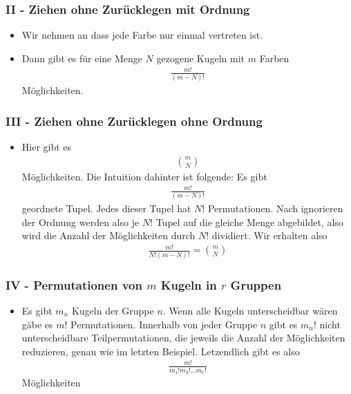 \documentclass{scrartcl}
\begin{document}
\subsubsection*{II - Ziehen ohne Zurücklegen mit Ordnung}
\begin{itemize}
    \item Wir nehmen an dass jede Farbe nur einmal vertreten ist.
    \item Dann gibt es für eine Menge $N$ gezogene Kugeln mit $m$ Farben
    \begin{align*}
        \frac{m!}{(m-N)!}
    \end{align*}
    Möglichkeiten.
\end{itemize}
\subsubsection*{III - Ziehen ohne Zurücklegen ohne Ordnung}
\begin{itemize}
    \item Hier gibt es
    \begin{align*}
        \binom{m}{N}
    \end{align*}
    Möglichkeiten. Die Intuition dahinter ist folgende: Es gibt \begin{align*}
        \frac{m!}{(m-N)!}
    \end{align*}
    geordnete Tupel. Jedes dieser Tupel hat $N!$ Permutationen. Nach ignorieren der Ordnung werden also je $N!$ Tupel auf die gleiche Menge abgebildet, also wird die Anzahl der Möglichkeiten durch $N!$ dividiert. Wir erhalten also
    \begin{align*}
        \frac{m!}{N!(m-N)!} = \binom{m}{N}
    \end{align*}
\end{itemize}
\subsubsection*{IV - Permutationen von $m$ Kugeln in $r$ Gruppen}
\begin{itemize}
    \item Es gibt $m_n$ Kugeln der Gruppe $n$. Wenn alle Kugeln unterscheidbar wären gäbe es $m!$ Permutationen. Innerhalb von jeder Gruppe $n$ gibt es $m_n!$ nicht unterscheidbare Teilpermutationen, die jeweils die Anzahl der Möglichkeiten reduzieren, genau wie im letzten Beispiel. Letzendlich gibt es also
    \begin{align*}
        \frac{m!}{m_1! m_2! \hdots m_r!}
    \end{align*}
    Möglichkeiten
\end{itemize}
\end{document}
